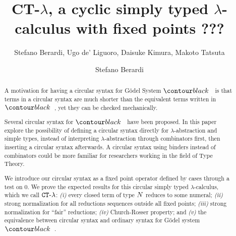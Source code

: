 \ifdraft

\title{CT-$\lambda$, a cyclic simply typed $\lambda$-calculus with fixed points}

\author{Stefano Berardi,  Ugo de' Liguoro, Daisuke Kimura, Makoto Tatsuta}
\date{}

\else

\title[Equivalence]
{
???
}

\author[S. Berardi]{Stefano Berardi}
\address{Universit\`{a} di Torino,
Torino, Italy}


\fi

\maketitle

\begin{abstract}
A motivation for having a circular syntax for G\"{o}del System $\systemT$ is that terms 
in a circular syntax are much shorter than the equivalent terms written in $\systemT$, 
yet they can be checked mechanically.

Several circular syntax for $\systemT$ have been proposed.
In this paper explore the possibility of defining a circular syntax
directly for $\lambda$-abstraction and simple types, instead of interpreting
 $\lambda$-abstraction through combinators first, then inserting a  circular syntax afterwards.
A circular syntax using binders instead of combinators
could be more familiar for researchers working in the field of Type Theory.

We introduce our circular syntax as a fixed point operator defined by cases through a test on $0$.
We prove the expected results for this circular simply typed $\lambda$-calculus, which we call ${ {\tt CT} \mbox{-} \lambda}$: 
\emph{(i)} every closed term of type ${N}$ reduces to some numeral;
\emph{(ii)}  strong normalization for all reductions sequences outside all fixed points; 
\emph{(iii)}  strong normalization for ``fair'' reductions; \emph{(iv)} Church-Rosser property;
and \emph{(v)} the equivalence between circular syntax and ordinary syntax 
for G\"{o}del system $\systemT$. 


\end{abstract}

\iffalse
key words: 
proof theory,
inductive definitions,
Brotherston-Simpson conjecture,
cyclic proofs,
Martin-Lof's system of inductive definitions,
infinite Ramsey theorem
Podelski-Rybalchenko termination theorem
size-change termination theorem
\fi